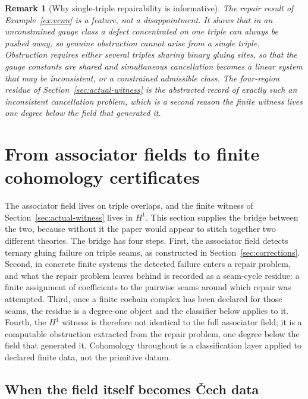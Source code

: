 \documentclass[11pt]{article}
\newtheorem{remark}[theorem]{Remark}
\begin{document}
\begin{remark}[Why single-triple repairability is informative]
The repair result of Example~\ref{ex:venn} is a feature, not a disappointment. It shows that in an unconstrained gauge class a defect concentrated on one triple can always be pushed away, so genuine obstruction cannot arise from a single triple. Obstruction requires either several triples sharing binary gluing sites, so that the gauge constants are shared and simultaneous cancellation becomes a linear system that may be inconsistent, or a constrained admissible class. The four-region residue of Section~\ref{sec:actual-witness} is the abstracted record of exactly such an inconsistent cancellation problem, which is a second reason the finite witness lives one degree below the field that generated it.
\end{remark}


\section{From associator fields to finite cohomology certificates}
\label{sec:certificates}

The associator field lives on triple overlaps, and the finite witness of Section~\ref{sec:actual-witness} lives in \(H^1\). This section supplies the bridge between the two, because without it the paper would appear to stitch together two different theories. The bridge has four steps. First, the associator field detects ternary gluing failure on triple seams, as constructed in Section~\ref{sec:corrections}. Second, in concrete finite systems the detected failure enters a repair problem, and what the repair problem leaves behind is recorded as a seam-cycle residue: a finite assignment of coefficients to the pairwise seams around which repair was attempted. Third, once a finite cochain complex has been declared for those seams, the residue is a degree-one object and the classifier below applies to it. Fourth, the \(H^1\) witness is therefore not identical to the full associator field; it is a computable obstruction extracted from the repair problem, one degree below the field that generated it. Cohomology throughout is a classification layer applied to declared finite data, not the primitive datum.

\subsection{When the field itself becomes \v{C}ech data}
\end{document}
